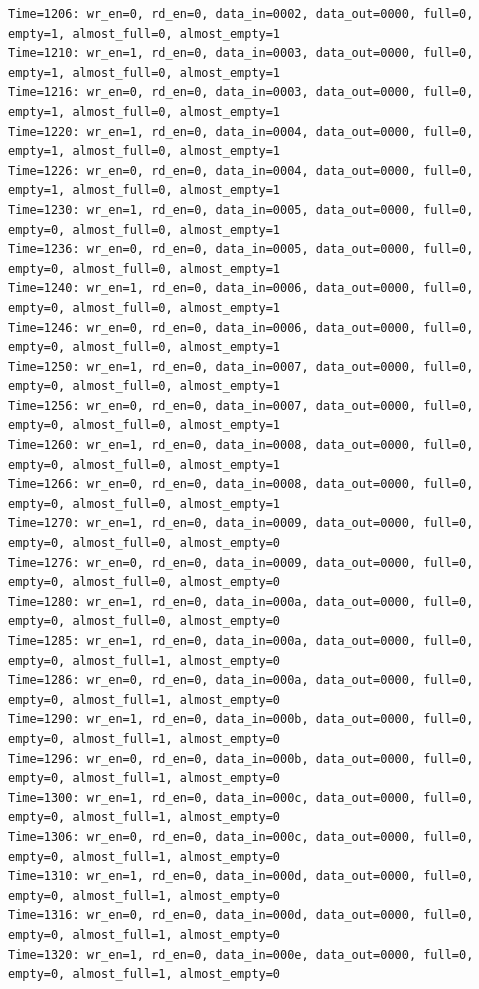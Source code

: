 \documentclass[UTF8]{ctexart}
\begin{document}
\begin{lstlisting}[frame=shadowbox]
Time=1206: wr_en=0, rd_en=0, data_in=0002, data_out=0000, full=0, empty=1, almost_full=0, almost_empty=1
Time=1210: wr_en=1, rd_en=0, data_in=0003, data_out=0000, full=0, empty=1, almost_full=0, almost_empty=1
Time=1216: wr_en=0, rd_en=0, data_in=0003, data_out=0000, full=0, empty=1, almost_full=0, almost_empty=1
Time=1220: wr_en=1, rd_en=0, data_in=0004, data_out=0000, full=0, empty=1, almost_full=0, almost_empty=1
Time=1226: wr_en=0, rd_en=0, data_in=0004, data_out=0000, full=0, empty=1, almost_full=0, almost_empty=1
Time=1230: wr_en=1, rd_en=0, data_in=0005, data_out=0000, full=0, empty=0, almost_full=0, almost_empty=1
Time=1236: wr_en=0, rd_en=0, data_in=0005, data_out=0000, full=0, empty=0, almost_full=0, almost_empty=1
Time=1240: wr_en=1, rd_en=0, data_in=0006, data_out=0000, full=0, empty=0, almost_full=0, almost_empty=1
Time=1246: wr_en=0, rd_en=0, data_in=0006, data_out=0000, full=0, empty=0, almost_full=0, almost_empty=1
Time=1250: wr_en=1, rd_en=0, data_in=0007, data_out=0000, full=0, empty=0, almost_full=0, almost_empty=1
Time=1256: wr_en=0, rd_en=0, data_in=0007, data_out=0000, full=0, empty=0, almost_full=0, almost_empty=1
Time=1260: wr_en=1, rd_en=0, data_in=0008, data_out=0000, full=0, empty=0, almost_full=0, almost_empty=1
Time=1266: wr_en=0, rd_en=0, data_in=0008, data_out=0000, full=0, empty=0, almost_full=0, almost_empty=1
Time=1270: wr_en=1, rd_en=0, data_in=0009, data_out=0000, full=0, empty=0, almost_full=0, almost_empty=0
Time=1276: wr_en=0, rd_en=0, data_in=0009, data_out=0000, full=0, empty=0, almost_full=0, almost_empty=0
Time=1280: wr_en=1, rd_en=0, data_in=000a, data_out=0000, full=0, empty=0, almost_full=0, almost_empty=0
Time=1285: wr_en=1, rd_en=0, data_in=000a, data_out=0000, full=0, empty=0, almost_full=1, almost_empty=0
Time=1286: wr_en=0, rd_en=0, data_in=000a, data_out=0000, full=0, empty=0, almost_full=1, almost_empty=0
Time=1290: wr_en=1, rd_en=0, data_in=000b, data_out=0000, full=0, empty=0, almost_full=1, almost_empty=0
Time=1296: wr_en=0, rd_en=0, data_in=000b, data_out=0000, full=0, empty=0, almost_full=1, almost_empty=0
Time=1300: wr_en=1, rd_en=0, data_in=000c, data_out=0000, full=0, empty=0, almost_full=1, almost_empty=0
Time=1306: wr_en=0, rd_en=0, data_in=000c, data_out=0000, full=0, empty=0, almost_full=1, almost_empty=0
Time=1310: wr_en=1, rd_en=0, data_in=000d, data_out=0000, full=0, empty=0, almost_full=1, almost_empty=0
Time=1316: wr_en=0, rd_en=0, data_in=000d, data_out=0000, full=0, empty=0, almost_full=1, almost_empty=0
Time=1320: wr_en=1, rd_en=0, data_in=000e, data_out=0000, full=0, empty=0, almost_full=1, almost_empty=0

\end{lstlisting}
\end{document}

